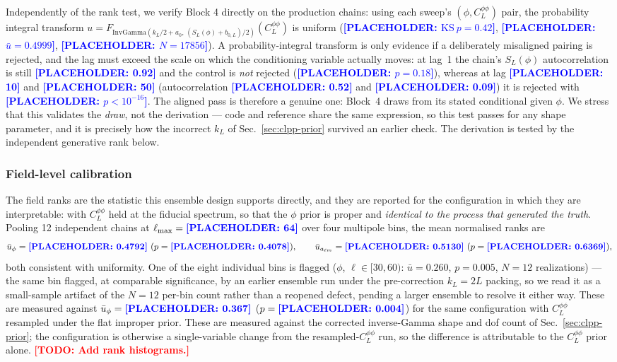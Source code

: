 \documentclass[twocolumn,superscriptaddress,aps,prl,floatfix]{revtex4-2}
\newcommand{\alm}{a_{\ell m}}
\newcommand{\clpp}{C_L^{\phi\phi}}
\newcommand{\lmax}{\ell_{\max}}
\newcommand{\todo}[1]{\textcolor{red}{\textbf{[TODO: #1]}}}
\newcommand{\placeholder}[1]{\textcolor{blue}{\textbf{[PLACEHOLDER: #1]}}}
\begin{document}
Independently of the rank test, we verify Block 4 directly on the production
chains: using each sweep's $(\phi, \clpp)$ pair, the probability integral
transform $u = F_{\mathrm{InvGamma}(k_L/2 + a_0,\,(S_L(\phi)+b_{0,L})/2)}(\clpp)$
is uniform (\placeholder{$\mathrm{KS}\ p = 0.42$}, \placeholder{$\bar u = 0.4999$},
\placeholder{$N = 17856$}). A probability-integral transform is only evidence
if a deliberately misaligned pairing is rejected, and the lag must exceed the
scale on which the conditioning variable actually moves: at lag~1 the chain's
$S_L(\phi)$ autocorrelation is still \placeholder{0.92} and the control is
\emph{not} rejected (\placeholder{$p = 0.18$}), whereas at lag
\placeholder{10} and \placeholder{50} (autocorrelation \placeholder{0.52} and
\placeholder{0.09}) it is rejected with \placeholder{$p < 10^{-16}$}. The
aligned pass is therefore a genuine one: Block~4 draws from its stated
conditional given $\phi$. We stress that this validates the \emph{draw}, not
the derivation --- code and reference share the same expression, so this test
passes for any shape parameter, and it is precisely how the incorrect $k_L$ of
Sec.~\ref{sec:clpp-prior} survived an earlier check. The derivation is tested
by the independent generative rank below.

\subsubsection*{Field-level calibration}

The field ranks are the statistic this ensemble design supports directly, and
they are reported for the configuration in which they are interpretable: with
$\clpp$ held at the fiducial spectrum, so that the $\phi$ prior is proper and
\emph{identical to the process that generated the truth}. Pooling 12
independent chains at $\lmax = \placeholder{64}$ over four multipole bins, the
mean normalised ranks are
\begin{equation*}
  \bar u_{\phi} = \placeholder{0.4792}\ (p = \placeholder{0.4078}), \qquad
  \bar u_{\alm} = \placeholder{0.5130}\ (p = \placeholder{0.6369}),
\end{equation*}
both consistent with uniformity. One of the eight individual bins is
flagged ($\phi$, $\ell \in [30,60)$: $\bar u = 0.260$, $p = 0.005$, $N=12$
realizations) --- the same bin flagged, at comparable significance, by an
earlier ensemble run under the pre-correction $k_L=2L$ packing, so we read it
as a small-sample artifact of the $N=12$ per-bin count rather than a
reopened defect, pending a larger ensemble to resolve it either way. These
are measured against $\bar u_\phi = \placeholder{0.367}$
($p = \placeholder{0.004}$) for the same configuration with $\clpp$ resampled
under the flat improper prior. These are measured against the corrected
inverse-Gamma shape and dof count of Sec.~\ref{sec:clpp-prior}; the
configuration is otherwise a single-variable change from the resampled-$\clpp$
run, so the difference is attributable to the $\clpp$ prior alone.
\todo{Add rank histograms.}
\end{document}
